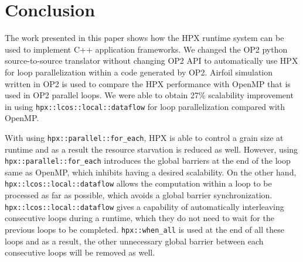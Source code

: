\documentclass[conference]{IEEEtran}
\begin{document}
\section{Conclusion}
\label{sec:future}

The work presented in this paper shows how the HPX runtime system can be used to implement C++ application frameworks. We changed the OP2 python source-to-source translator without changing OP2 API to automatically use HPX for loop parallelization within a code generated by OP2. Airfoil simulation written in OP2 is used to compare the HPX performance with OpenMP that is used in OP2 parallel loops. We were able to obtain 27\% scalability improvement in using \texttt{hpx::lcos::local::dataflow} for loop parallelization compared with OpenMP.

With using \texttt{hpx::parallel::for\_each}, HPX is able to control a grain size at runtime and as a result the resource starvation is reduced as well. However, using \texttt{hpx::parallel::for\_each} introduces the global barriers at the end of the loop same as OpenMP, which inhibits having a desired scalability. On the other hand, \texttt{hpx::lcos::local::dataflow} allows the computation within a loop to be processed as far as possible, which avoids a global barrier synchronization. \texttt{hpx::lcos::local::dataflow} gives a capability of automatically interleaving consecutive loops during a runtime, which they do not need to wait for the previous loops to be completed. \texttt{hpx::when\_all} is used at the end of all these loops and as a result, the other unnecessary global barrier between each consecutive loops will be removed as well. 



 




\end{document}
